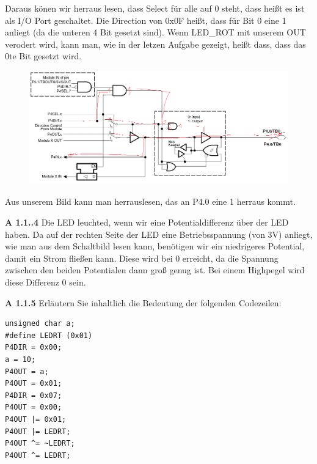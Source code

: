 \begin{description}
\begin{itemize}
\end{itemize}

Daraus könen wir herraus lesen, dass Select für alle auf 0 steht, dass heißt es ist als I/O Port geschaltet. Die Direction von 0x0F heißt, dass für Bit 0 eine 1 anliegt (da die unteren 4 Bit gesetzt sind). Wenn LED\_ROT mit unserem OUT verodert wird, kann man, wie in der letzen Aufgabe gezeigt, heißt dass, dass das 0te Bit gesetzt wird.\\

\begin{figure}[h!]
	\includegraphics[scale=0.6]{1_3.png}
\end{figure}

Aus unserem Bild kann man herrauslesen, das an P4.0 eine 1 herraus kommt.

\item{\bfseries A 1.1..4} Die LED leuchted, wenn wir eine Potentialdifferenz über der LED haben. Da auf der rechten Seite der LED eine Betriebsspannung (von 3V) anliegt, wie man aus dem Schaltbild lesen kann, benötigen wir ein niedrigeres Potential, damit ein Strom fließen kann. Diese wird bei 0 erreicht, da die Spannung zwischen den beiden Potentialen dann groß genug ist. Bei einem Highpegel wird diese Differenz 0 sein.

\pagebreak

\item{\bfseries A 1.1.5} Erläutern Sie inhaltlich die Bedeutung der folgenden Codezeilen:

\begin{lstlisting}
unsigned char a;
#define LEDRT (0x01)
P4DIR = 0x00;
a = 10;
P4OUT = a;
P4OUT = 0x01;
P4DIR = 0x07;
P4OUT = 0x00;
P4OUT |= 0x01;
P4OUT |= LEDRT;
P4OUT ^= ~LEDRT;
P4OUT ^= LEDRT;
\end{lstlisting}


\end{description}
